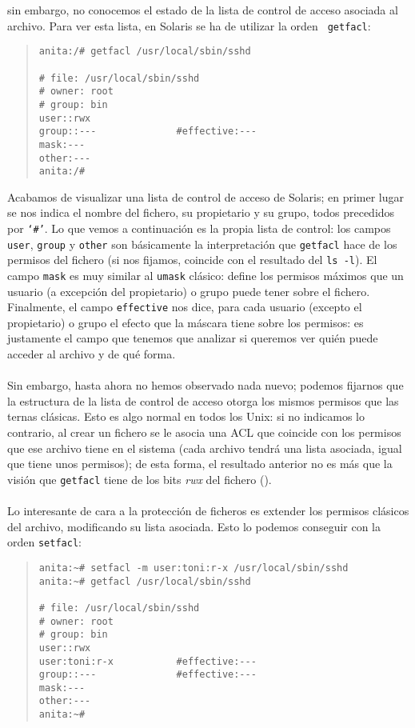 sin embargo, no conocemos el estado de la lista de control de acceso asociada al
archivo. Para ver esta lista, en Solaris se ha de utilizar la orden {\tt 
getfacl}:
\begin{quote}
\begin{verbatim}
anita:/# getfacl /usr/local/sbin/sshd 

# file: /usr/local/sbin/sshd
# owner: root
# group: bin
user::rwx
group::---              #effective:---
mask:---
other:---
anita:/# 
\end{verbatim}
\end{quote}
Acabamos de visualizar una lista de control de acceso de Solaris; en primer 
lugar se nos indica el nombre del fichero, su propietario y su grupo, todos
precedidos por {\tt `\#'}. Lo que vemos a continuaci\'on es la propia lista de
control: los campos {\tt user}, {\tt group} y {\tt other} son b\'asicamente
la interpretaci\'on que {\tt getfacl} hace de los permisos del fichero (si nos
fijamos, coincide con el resultado del {\tt ls -l}). El campo {\tt mask} es
muy similar al {\tt umask} cl\'asico: define los permisos m\'aximos que un
usuario (a excepci\'on del propietario) o grupo puede tener sobre el fichero. 
Finalmente, el campo {\tt effective} nos dice, para cada usuario (excepto el
propietario) o grupo el efecto que la m\'ascara tiene sobre los permisos: es
justamente el campo que tenemos que analizar si queremos ver qui\'en puede
acceder al archivo y de qu\'e forma.\\
\\Sin embargo, hasta ahora no hemos observado nada nuevo; podemos fijarnos que
la estructura de la lista de control de acceso otorga los mismos permisos que
las ternas cl\'asicas. Esto es algo normal en todos los Unix: si no indicamos
lo contrario, al crear un fichero se le asocia una ACL que coincide con los
permisos que ese archivo tiene en el sistema (cada archivo tendr\'a una lista
asociada, igual que tiene unos permisos); de esta forma, el resultado anterior
no es m\'as que la visi\'on que {\tt getfacl} tiene de los bits {\it rwx} 
del fichero (\cite{kn:gal96b}).\\ 
\\Lo interesante de cara a la protecci\'on de ficheros es extender los permisos
cl\'asicos del archivo, modificando su lista asociada. Esto lo podemos conseguir
con la orden {\tt setfacl}:
\begin{quote}
\begin{verbatim}
anita:~# setfacl -m user:toni:r-x /usr/local/sbin/sshd 
anita:~# getfacl /usr/local/sbin/sshd 

# file: /usr/local/sbin/sshd
# owner: root
# group: bin
user::rwx
user:toni:r-x           #effective:---
group::---              #effective:---
mask:---
other:---
anita:~# 
\end{verbatim}
\end{quote}
